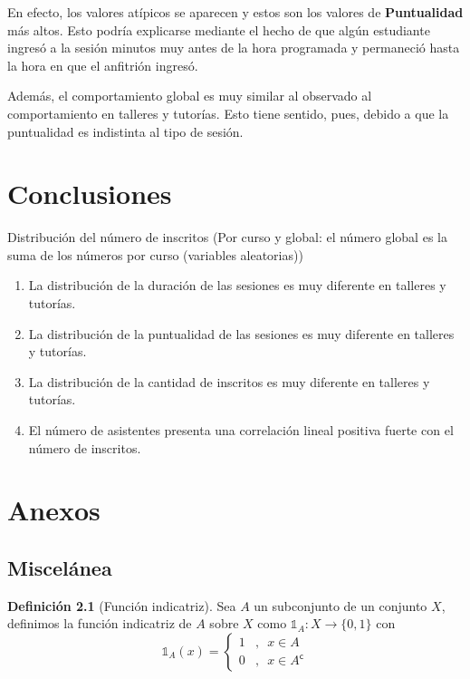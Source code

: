 \documentclass[11pt,a4paper]{book}
\theoremstyle{definition}%
\newtheorem{definicion}[teorema]{Definici\'on}
\newcommand{\setcomplement}{\mathsf{c}}
\begin{document}
            En efecto, los valores atípicos se aparecen y estos son los valores de \textbf{Puntualidad} más altos. Esto podría explicarse mediante el hecho de que algún estudiante ingresó a la sesión minutos muy antes de la hora programada y permaneció hasta la hora en que el anfitrión ingresó.

            Además, el comportamiento global es muy similar al observado al comportamiento en talleres y tutorías. Esto tiene sentido, pues, debido a que la puntualidad es indistinta al tipo de sesión.
    
    \chapter{Conclusiones}
        Distribución del número de inscritos (Por curso y global: el número global es la suma de los números por curso (variables aleatorias))
        \begin{enumerate}
            \item La distribución de la duración de las sesiones es muy diferente en talleres y tutorías.
            \item La distribución de la puntualidad de las sesiones es muy diferente en talleres y tutorías.
            \item La distribución de la cantidad de inscritos es muy diferente en talleres y tutorías.
            \item El número de asistentes presenta una correlación lineal positiva fuerte con el número de inscritos.
        \end{enumerate}
    \chapter{Anexos}
        \section{Miscelánea}
            \begin{definicion}[Función indicatriz]
                Sea $A$ un subconjunto de un conjunto $X$, definimos la función indicatriz de $A$ sobre $X$ como $\mathds{1}_A:X\longrightarrow\{0,1\}$ con
                \begin{equation*}
                    \mathds{1}_A (x)=\left\{\begin{array}{cl}
                        1&,\enspace x\in A  \\
                        0&,\enspace x \in A^\setcomplement
                    \end{array}\right.
                \end{equation*}
            \end{definicion}
\end{document}
